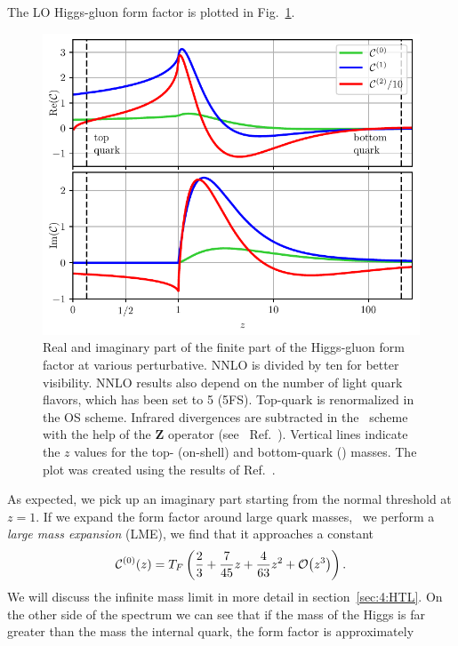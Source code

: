 The \acs{LO} Higgs-gluon form factor is plotted in Fig.~\ref{fig:4:form_factor}.
\begin{figure}[h]
\centering
\includegraphics[width=\figurewidth]{Images/form_factor.pdf}
\caption{Real and imaginary part of the finite part of the Higgs-gluon form factor at various perturbative. \acs{NNLO} is divided by ten for better visibility. \acs{NNLO} results also depend on the number of light quark flavors, which has been set to 5 (5\acs{FS}). Top-quark is renormalized in the \acs{OS} scheme. Infrared divergences are subtracted in the \MS\ scheme with the help of the $\mathbf{Z}$ operator (see \eg\ Ref.~\cite{Czakon:2014oma}). Vertical lines indicate the $z$ values for the top- (on-shell) and bottom-quark (\MS) masses. The plot was created using the results of Ref.~\cite{Czakon:2020vql}.}
\label{fig:4:form_factor}
\end{figure}
As expected, we pick up an imaginary part starting from the normal threshold at $z=1$. If we expand the form factor around large quark masses, \ie\ we perform a \textit{large mass expansion} (\acs{LME}), we find that it approaches a constant
\begin{equation}
\mathcal{C}^{(0)}(z) = T_F \left( \frac{2}{3} + \frac{7}{45} z + \frac{4}{63} z^2 + \mathcal{O}\!\left(z^3\right) \right).
\label{eq:4:LME}
\end{equation}
We will discuss the infinite mass limit in more detail in section~\ref{sec:4:HTL}. On the other side of the spectrum we can see that if the mass of the Higgs is far greater than the mass the internal quark, the form factor is approximately
